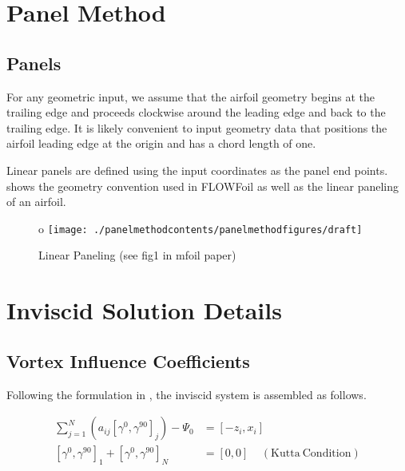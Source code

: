 \clearpage
\newpage


\section{Panel Method}
\label{sec:panelmethod}

\subsection{Panels}
\label{ssec:panels}

For any geometric input, we assume that the airfoil geometry begins at the trailing edge and proceeds clockwise around the leading edge and back to the trailing edge.
It is likely convenient to input geometry data that positions the airfoil leading edge at the origin and has a chord length of one.

Linear panels are defined using the input coordinates as the panel end points.
 shows the geometry convention used in FLOWFoil as well as the linear paneling of an airfoil.

\begin{figure}[h]
	\centering
o	\texttt{[image: ./panelmethodcontents/panelmethodfigures/draft]}
	\caption{Linear Paneling (see fig1 in mfoil paper)}
	\label{fig:linearpanels}
\end{figure}


\section{Inviscid Solution Details}
\label{sec:inviscidsolution}


\subsection{Vortex Influence Coefficients}
\label{ssec:vortexinfluencecoefficients}

Following the formulation in \cite{fidkowski_coupled_2022}, the inviscid system is assembled as follows.

\begin{equation}
	\begin{aligned}
		\sum_{j=1}^N(a_{ij}[\gamma^0, \gamma^{90}]_j) - \Psi_0 &= [-z_i, x_i] \\
		[\gamma^0, \gamma^{90}]_1 + [\gamma^0, \gamma^{90}]_N &= [0, 0] ~~~~~\mathrm{(Kutta~Condition)}
	\end{aligned}
\end{equation}

